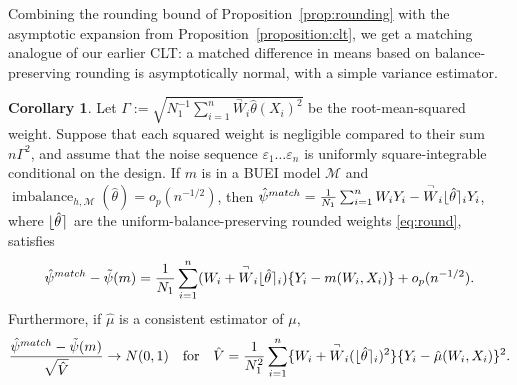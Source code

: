 \documentclass{article}
\theoremstyle{definition}
\newtheorem{corollary}[theorem]{Corollary}
\DeclarePairedDelimiter\round{\lfloor}{\rceil}
\newcommand{\estimand}{\psi}
\DeclareMathOperator{\imbalance}{imbalance}
\newcommand{\htheta}{\hat\theta}
\newcommand{\model}{\mathcal{M}}
\newcommand{\<}{\langle}
\renewcommand{\>}{\rangle}
\begin{document}
Combining the rounding bound of Proposition~\ref{prop:rounding} with the asymptotic expansion from Proposition~\ref{proposition:clt}, we get a matching analogue of our earlier CLT: a matched difference in means based on balance-preserving rounding is asymptotically normal, with a simple variance estimator.

\begin{corollary}
\label{cor:rounding}
Let $\Gamma :=  \sqrt{N_1^{-1}\sum_{i=1}^n \overset{\neg}W_i \htheta(X_i)^2}$ be the root-mean-squared weight. Suppose that each squared weight is negligible compared to their sum $n\Gamma^2$, and assume that the noise sequence $\varepsilon_1 \ldots \varepsilon_n$ is uniformly square-integrable conditional on the design.
If $m$ is in a BUEI model $\model$ and $\imbalance_{h,\model}(\htheta) = o_p(n^{-1/2})$,
then $\hat\psi^{match}=\frac{1}{N_1}\sum_{i=1}^n W_iY_i - \overset{\neg}W_i \round{\htheta}_i Y_i$, where $\round{\htheta}$ are the uniform-balance-preserving rounded weights \eqref{eq:round}, satisfies
\begin{equation}
\label{eq:asymptotic-linearity-rounded}
\hat\psi^{match}-\tilde\psi(m) = \frac{1}{N_1} \sum_{i=1}^{n}(W_i + \overset{\neg} W_i \round{\htheta}_i)\{ Y_i - m(W_i,X_i) \} + o_p(n^{-1/2}).
\end{equation}
Furthermore, if $\hat \mu$ is a consistent estimator of $\mu$,
 \begin{equation}
 \label{eq:asymptotic-normality-rounded}
  \frac{\hat\psi^{match} - \tilde\estimand(m)}{\sqrt{\hat V}} \to N(0,1) \quad \text{for} \quad
 \hat V = \frac{1}{N_1^2}\sum_{i=1}^n \{W_i + \overset{\neg}{W}_i (\round{\htheta}_i)^2\} \{Y_i - \hat \mu(W_i, X_i)\}^2.
\end{equation}
\end{corollary}
\end{document}
